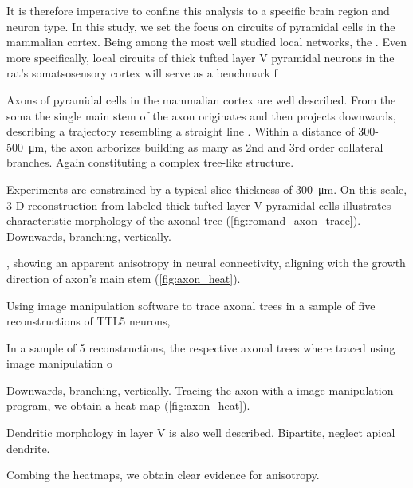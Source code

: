 It is therefore imperative to confine this analysis to a specific
brain region and neuron type. In this study, we set the focus on
circuits of pyramidal cells in the mammalian cortex. Being among the
most well studied local networks, the . Even more specifically, local
circuits of thick tufted layer V pyramidal neurons in the rat's
somatsosensory cortex will serve as a benchmark f


Axons of pyramidal cells in the mammalian cortex are well
described. From the soma the single main stem of the axon
originates and then projects downwards, describing a trajectory resembling
a straight line \parencite[p.~67]{Braitenberg_Cortex}. Within a
distance of 300-\SI{500}{\micro\meter}, the axon arborizes building
as many as 2nd and 3rd order collateral branches. Again
constituting a complex tree-like structure. 

Experiments are constrained by a typical slice thickness of
\SI{300}{\micro\meter}. On this scale, 3-D reconstruction from labeled
thick tufted layer V pyramidal cells illustrates characteristic
morphology of the axonal tree (\autoref{fig:romand_axon_trace}). Downwards, branching,
vertically. 


, showing an apparent anisotropy in neural connectivity, aligning with
the growth direction of axon's main stem (\autoref{fig:axon_heat}).



Using image manipulation software to trace axonal trees in a
sample of five reconstructions of TTL5 neurons,   
 
In a sample of 5 reconstructions, the respective axonal
trees where traced using image manipulation o 


Downwards, branching,
vertically. Tracing the axon with a image manipulation program, we
obtain a heat map (\autoref{fig:axon_heat}).

Dendritic morphology in layer V is also well
described.  Bipartite,
neglect apical dendrite.


Combing the heatmaps, we obtain clear evidence for anisotropy. 










